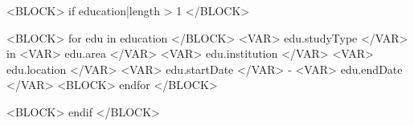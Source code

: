 <BLOCK> if education|length > 1 </BLOCK>


\begin{cventries}
<BLOCK> for edu in education </BLOCK>
  \cventry
    {<VAR> edu.studyType </VAR> in <VAR> edu.area </VAR>} %
    {<VAR> edu.institution </VAR>}                       %
    {<VAR> edu.location </VAR>}                          %
    {<VAR> edu.startDate </VAR> - <VAR> edu.endDate </VAR>} %
    {\newline}
<BLOCK> endfor </BLOCK>
\end{cventries}
<BLOCK> endif </BLOCK>
